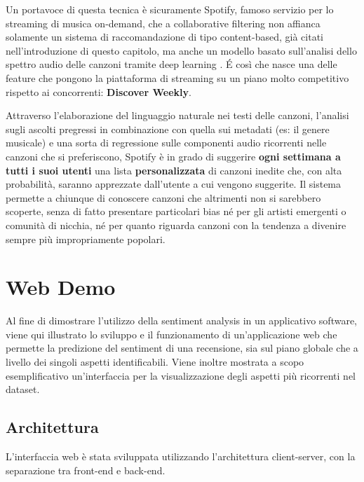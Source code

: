 \documentclass[hidelinks, 12pt]{article}
\begin{document}
Un portavoce di questa tecnica è sicuramente Spotify\cite{site:spotify}, famoso servizio per lo streaming di musica on-demand, che a collaborative filtering non affianca solamente un sistema di raccomandazione di tipo content-based, già citati nell'introduzione di questo capitolo, ma anche un modello basato sull'analisi dello spettro audio delle canzoni tramite deep learning \cite{site:spotify-article}. É così che nasce una delle feature che pongono la piattaforma di streaming su un piano molto competitivo rispetto ai concorrenti: \textbf{Discover Weekly}\cite{site:spotify-discover}.

Attraverso l'elaborazione del linguaggio naturale nei testi delle canzoni, l'analisi sugli ascolti pregressi in combinazione con quella sui metadati (es: il genere musicale) e una sorta di regressione sulle componenti audio ricorrenti nelle canzoni che si preferiscono, Spotify è in grado di suggerire \textbf{ogni settimana a tutti i suoi utenti} una lista \textbf{personalizzata} di canzoni inedite che, con alta probabilità, saranno apprezzate dall'utente a cui vengono suggerite. Il sistema permette a chiunque di conoscere canzoni che altrimenti non si sarebbero scoperte, senza di fatto presentare particolari bias né per gli artisti emergenti o comunità di nicchia, né per quanto riguarda canzoni con la tendenza a divenire sempre più impropriamente popolari.



\clearpage



\section{Web Demo}
\label{sec:ui}

Al fine di dimostrare l'utilizzo della sentiment analysis in un applicativo software, viene qui illustrato lo sviluppo e il funzionamento di un'applicazione web che permette la predizione del sentiment di una recensione, sia sul piano globale che a livello dei singoli aspetti identificabili. Viene inoltre mostrata a scopo esemplificativo un'interfaccia per la visualizzazione degli aspetti più ricorrenti nel dataset.



\subsection{Architettura}

L'interfaccia web è stata sviluppata utilizzando l'architettura client-server, con la separazione tra front-end e back-end.
\end{document}
